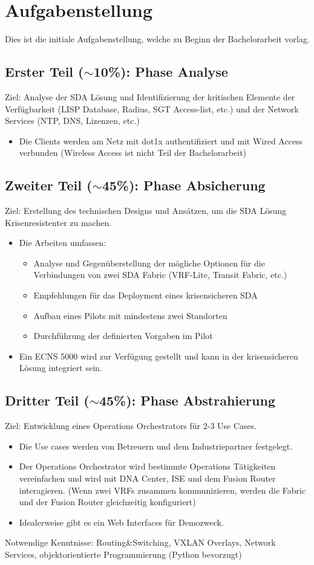 \section{Aufgabenstellung}
Dies ist die initiale Aufgabenstellung, welche zu Beginn der Bachelorarbeit vorlag. 

\subsection{Erster Teil ($\sim$10\%): Phase Analyse}
Ziel: Analyse der SDA Lösung und Identifizierung der kritischen Elemente der Verfügbarkeit (LISP Database, Radius, SGT Access-list, etc.) und der Network Services (NTP, DNS, Lizenzen, etc.)
\begin{itemize}
	\item Die Clients werden am Netz mit dot1x authentifiziert und mit Wired Access verbunden (Wireless Access ist nicht Teil der Bachelorarbeit)
\end{itemize}


\subsection{Zweiter Teil ($\sim$45\%): Phase Absicherung}
Ziel: Erstellung des technischen Designs und Ansätzen, um die SDA Lösung Krisenresistenter zu machen.
\begin{itemize}
	\item Die Arbeiten umfassen:
	\begin{itemize}
		\item Analyse und Gegenüberstellung der mögliche Optionen für die Verbindungen von zwei SDA Fabric (VRF-Lite, Transit Fabric, etc.)
		\item Empfehlungen für das Deployment eines krisensicheren SDA
		\item Aufbau eines Pilots mit mindestens zwei Standorten
		\item Durchführung der definierten Vorgaben im Pilot
	\end{itemize}
	\item Ein ECNS 5000 wird zur Verfügung gestellt und kann in der krisensicheren Lösung integriert sein.
\end{itemize}


\subsection{Dritter Teil ($\sim$45\%): Phase Abstrahierung}
Ziel: Entwicklung eines Operations Orchestrators für 2-{\tiny }3 Use Cases. 
\begin{itemize}
	\item Die Use cases werden von Betreuern und dem Industriepartner festgelegt.
	\item Der Operations Orchestrator wird bestimmte Operations Tätigkeiten vereinfachen und wird mit DNA Center, ISE und dem Fusion Router interagieren. (Wenn zwei VRFs zusammen kommunizieren, werden die Fabric und der Fusion Router gleichzeitig konfiguriert)
	\item Idealerweise gibt es ein Web Interfaces für Demozweck.
\end{itemize}

Notwendige Kenntnisse: Routing\&Switching, VXLAN Overlays, Network Services, objektorientierte Programmierung (Python bevorzugt)


